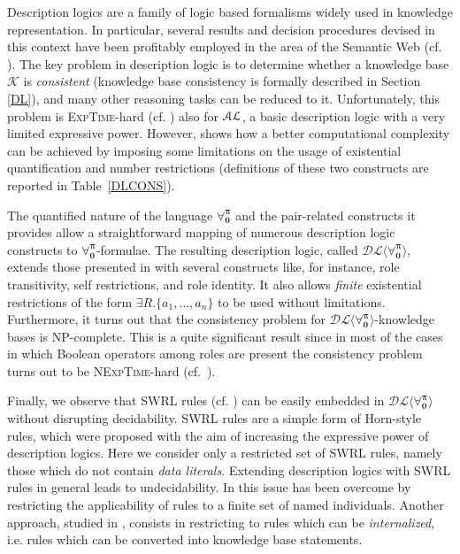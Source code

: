 \documentclass[a4paper,UKenglish]{lipics}
\newcommand{\Lang}{\ensuremath{\mathbf{\forall_{0}^{\pi}}}\xspace}
\newcommand{\dlLang}{\ensuremath{\mathcal{DL\langle}\Lang\mathcal{\rangle}}\xspace}
\begin{document}
Description logics are a family of logic based formalisms widely used
in knowledge representation. In particular, several results and
decision procedures devised in this context have been profitably
employed in the area of the Semantic Web (cf. \cite{HorKutSat2006}).
%
The key problem in description logic is to determine whether a
knowledge base $\mathcal{K}$ is \emph{consistent} (knowledge base
consistency is formally described in Section \ref{DL}), and many other
reasoning tasks can be reduced to it.  Unfortunately, this problem is
\textsc{ExpTime}-hard (cf.  \cite[Theorem 3.27, page 132]{DLHANDBOOK})
also for $\mathcal{AL}$, a basic description logic with a very limited
expressive power.  However, \cite{CanLonPis2010} shows how a better
computational complexity can be achieved by imposing some limitations
on the usage of existential quantification and number restrictions
(definitions of these two constructs are reported in
Table~\ref{DLCONS}).

The quantified nature of the language \Lang and the pair-related
constructs it provides allow a straightforward mapping of numerous
description logic constructs to \Lang-formulae.  The resulting
description logic, called \dlLang, extends those presented in
\cite{CanLonPis2010} with several constructs like, for instance, role
transitivity, self restrictions, and role identity.  It also allows
\emph{finite} existential restrictions of the form $\exists R.\{a_1,
\ldots, a_n\}$ to be used without limitations.  Furthermore, it turns
out that the consistency problem for \dlLang-knowledge bases is
\textsc{NP}-complete.  This is a quite significant result since in
most of the cases in which Boolean operators among roles are present
the consistency problem turns out to be \textsc{NExpTime}-hard
(cf.~\cite{Lutz2001}).


Finally, we observe that \textsf{SWRL} rules (cf.  \cite{HorPat2004}) can be
easily embedded in \dlLang without disrupting decidability.  \textsf{SWRL}
rules
are a simple form of Horn-style rules, which were proposed with the
aim of increasing the expressive power of description logics.
Here we consider only a restricted set of \textsf{SWRL} rules,
namely those which do not contain \emph{data literals}. Extending
description logics with \textsf{SWRL} rules in general leads to
undecidability.  In \cite{MotSatStu2005} this issue has been overcome
by restricting the applicability of rules to a finite set of named
individuals.
%
Another approach, studied in \cite{KroRudHit2008}, consists in
restricting to rules which can be \emph{internalized}, i.e. rules
which can be converted into knowledge base statements.
\end{document}
